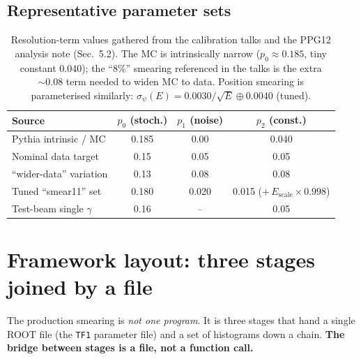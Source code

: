 \documentclass[11pt]{article}
\begin{document}
\subsection{Representative parameter sets}
\begin{table}[h]
\centering\small
\begin{tabular}{lccc}
\toprule
Source & $p_0$ (stoch.) & $p_1$ (noise) & $p_2$ (const.) \\
\midrule
Pythia intrinsic / MC      & 0.185 & 0.00  & 0.040 \\
Nominal data target        & 0.15  & 0.05  & 0.05  \\
``wider-data'' variation   & 0.13  & 0.08  & 0.08  \\
Tuned ``smear11'' set       & 0.180 & 0.020 & 0.015 \quad($+\,E_{\text{scale}}\!\times0.998$)\\
Test-beam single $\gamma$  & 0.16  & --    & 0.05  \\
\bottomrule
\end{tabular}
\caption{Resolution-term values gathered from the calibration talks and the
PPG12 analysis note (Sec.~5.2). The MC is intrinsically narrow ($p_0\!\approx\!0.185$,
tiny constant 0.040); the ``8\%'' smearing referenced in the talks is the extra
$\sim0.08$ term needed to widen MC to data. Position smearing is parameterised
similarly: $\sigma_\psi(E)=0.0030/\sqrt{E}\oplus0.0040$ (tuned).}
\end{table}

\section{Framework layout: three stages joined by a file}
The production smearing is \emph{not one program}. It is three stages that hand a
single ROOT file (the \texttt{TF1} parameter file) and a set of histograms down a
chain. \textbf{The bridge between stages is a file, not a function call.}
\end{document}
